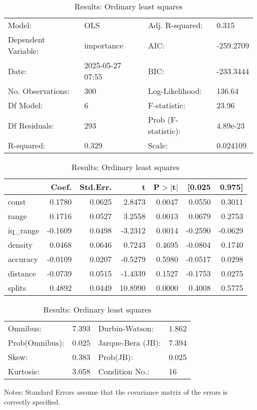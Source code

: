 \begin{table}
\caption{Results: Ordinary least squares}
\label{}
\begin{center}
\begin{tabular}{llll}
\hline
Model:              & OLS              & Adj. R-squared:     & 0.315      \\
Dependent Variable: & importance       & AIC:                & -259.2709  \\
Date:               & 2025-05-27 07:55 & BIC:                & -233.3444  \\
No. Observations:   & 300              & Log-Likelihood:     & 136.64     \\
Df Model:           & 6                & F-statistic:        & 23.96      \\
Df Residuals:       & 293              & Prob (F-statistic): & 4.89e-23   \\
R-squared:          & 0.329            & Scale:              & 0.024109   \\
\hline
\end{tabular}
\end{center}

\begin{center}
\begin{tabular}{lrrrrrr}
\hline
          &   Coef. & Std.Err. &       t & P$> |$t$|$ &  [0.025 &  0.975]  \\
\hline
const     &  0.1780 &   0.0625 &  2.8473 &      0.0047 &  0.0550 &  0.3011  \\
range     &  0.1716 &   0.0527 &  3.2558 &      0.0013 &  0.0679 &  0.2753  \\
iq\_range & -0.1609 &   0.0498 & -3.2312 &      0.0014 & -0.2590 & -0.0629  \\
density   &  0.0468 &   0.0646 &  0.7243 &      0.4695 & -0.0804 &  0.1740  \\
accuracy  & -0.0109 &   0.0207 & -0.5279 &      0.5980 & -0.0517 &  0.0298  \\
distance  & -0.0739 &   0.0515 & -1.4339 &      0.1527 & -0.1753 &  0.0275  \\
splits    &  0.4892 &   0.0449 & 10.8990 &      0.0000 &  0.4008 &  0.5775  \\
\hline
\end{tabular}
\end{center}

\begin{center}
\begin{tabular}{llll}
\hline
Omnibus:       & 7.393 & Durbin-Watson:    & 1.862  \\
Prob(Omnibus): & 0.025 & Jarque-Bera (JB): & 7.394  \\
Skew:          & 0.383 & Prob(JB):         & 0.025  \\
Kurtosis:      & 3.058 & Condition No.:    & 16     \\
\hline
\end{tabular}
\end{center}
\end{table}
\bigskip
Notes: \newline 
[1] Standard Errors assume that the covariance matrix of the errors is correctly specified.